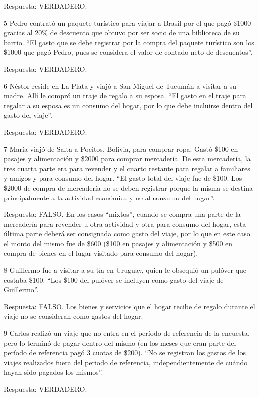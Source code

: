\documentclass[
  openany]{book}
\begin{document}
Respuesta: VERDADERO.

5 Pedro contrató un paquete turístico para viajar a Brasil por el que pagó \$1000 gracias al 20\% de descuento que obtuvo por ser socio de una biblioteca de su barrio.
``El gasto que se debe registrar por la compra del paquete turístico son los \$1000 que pagó Pedro, pues se considera el valor de contado neto de descuentos''.

Respuesta: VERDADERO.

6 Néstor reside en La Plata y viajó a San Miguel de Tucumán a visitar a su madre. Allí le compró un traje de regalo a su esposa.
``El gasto en el traje para regalar a su esposa es un consumo del hogar, por lo que debe incluirse dentro del gasto del viaje''.

Respuesta: VERDADERO.

7 María viajó de Salta a Pocitos, Bolivia, para comprar ropa. Gastó \$100 en pasajes y alimentación y \$2000 para comprar mercadería. De esta mercadería, la tres cuarta parte era para revender y el cuarto restante para regalar a familiares y amigos y para consumo del hogar.
``El gasto total del viaje fue de \$100. Los \$2000 de compra de mercadería no se deben registrar porque la misma se destina principalmente a la actividad económica y no al consumo del hogar''.

Respuesta: FALSO. En los casos ``mixtos'', cuando se compra una parte de la mercadería para revender u otra actividad y otra para consumo del hogar, esta última parte deberá ser consignada como gasto del viaje, por lo que en este caso el monto del mismo fue de \$600 (\$100 en pasajes y alimentación y \$500 en compra de bienes en el lugar visitado para consumo del hogar).

8 Guillermo fue a visitar a su tía en Uruguay, quien le obsequió un pulóver que costaba \$100.
``Los \$100 del pulóver se incluyen como gasto del viaje de Guillermo''.

Respuesta: FALSO. Los bienes y servicios que el hogar recibe de regalo durante el viaje no se consideran como gastos del hogar.

9 Carlos realizó un viaje que no entra en el período de referencia de la encuesta, pero lo terminó de pagar dentro del mismo (en los meses que eran parte del período de referencia pagó 3 cuotas de \$200).
``No se registran los gastos de los viajes realizados fuera del periodo de referencia, independientemente de cuándo hayan sido pagados los mismos''.

Respuesta: VERDADERO.
\end{document}
